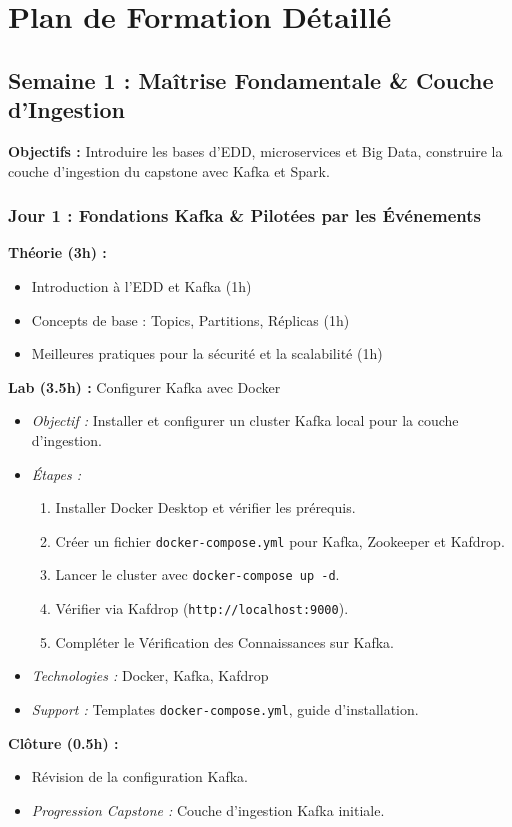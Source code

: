 \documentclass[11pt]{article}
\begin{document}
\section{Plan de Formation Détaillé}

\subsection{Semaine 1 : Maîtrise Fondamentale \& Couche d'Ingestion}
\textbf{Objectifs :} Introduire les bases d'EDD, microservices et Big Data, construire la couche d'ingestion du capstone avec Kafka et Spark.

\subsubsection{Jour 1 : Fondations Kafka \& Pilotées par les Événements}
\textbf{Théorie (3h) :}
\begin{itemize}
    \item Introduction à l'EDD et Kafka (1h)
    \item Concepts de base : Topics, Partitions, Réplicas (1h)
    \item Meilleures pratiques pour la sécurité et la scalabilité (1h)
\end{itemize}
\textbf{Lab (3.5h) :} Configurer Kafka avec Docker
\begin{itemize}
    \item \textit{Objectif :} Installer et configurer un cluster Kafka local pour la couche d'ingestion.
    \item \textit{Étapes :}
        \begin{enumerate}
            \item Installer Docker Desktop et vérifier les prérequis.
            \item Créer un fichier \texttt{docker-compose.yml} pour Kafka, Zookeeper et Kafdrop.
            \item Lancer le cluster avec \texttt{docker-compose up -d}.
            \item Vérifier via Kafdrop (\texttt{http://localhost:9000}).
            \item Compléter le Vérification des Connaissances sur Kafka.
        \end{enumerate}
    \item \textit{Technologies :} Docker, Kafka, Kafdrop
    \item \textit{Support :} Templates \texttt{docker-compose.yml}, guide d'installation.
\end{itemize}
\textbf{Clôture (0.5h) :}
\begin{itemize}
    \item Révision de la configuration Kafka.
    \item \textit{Progression Capstone :} Couche d'ingestion Kafka initiale.
\end{itemize}
\end{document}

